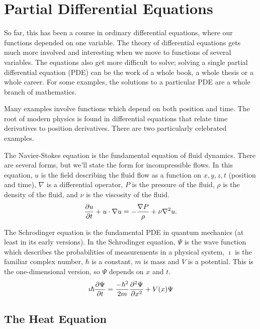 \documentclass[fleqn,letterpaper]{report}
\begin{document}
\chapter{Partial Differential Equations}
\label{pdes}

So far, this has been a course in ordinary differential
equations, where our functions depended on one variable. The
theory of differential equations gets much more involved and
interesting when we move to functions of several variables.
The equations also get more difficult to solve; solving a
single partial differential equation (PDE) can be the work of
a whole book, a whole thesis or a whole career. For some examples,
the solutions to a particular PDE are a whole branch of
mathematics.

Many examples involve functions which depend on both position
and time. The root of modern physics is found in
differential equations that relate time derivatives to
position derivatives. There are two particularly celebrated
examples. 

\begin{example}
The Navier-Stokes equation is the
fundamental equation of fluid dynamics.
There are several forms, but we'll state the form for
incompressible flows. In this equation, $u$ is the field
describing the fluid flow as a function on $x,y,z,t$ (position
and time), $\nabla$ is a differential operator, $P$ is the
pressure of the fluid, $\rho$ is the density of the fluid, and
$\nu$ is the viscosity of the fluid. 
\begin{equation*}
\frac{\partial u}{\partial t} + u \cdot \nabla u = - \frac{\nabla
P}{\rho} + \nu \nabla^2 u.
\end{equation*}
\end{example}

\begin{example}
The Schrodinger equation
is the fundamental PDE in quantum mechanics (at least in
its early versions). In the Schrodinger equation, $\Psi$ is
the wave function which describes the probabilities of
measurements in a physical system, $\imath$ is the familiar
complex number, $\hbar$ is a constant, $m$ is mass and $V$ is
a potential. This is the one-dimensional version, so $\Psi$ depends on
$x$ and $t$.
\begin{equation*}
\imath \hbar \frac{\partial \Psi}{\partial t} = \frac{-\hbar^2}{2m}
\frac{\partial^2 \Psi}{\partial x^2} + V(x) \Psi
\end{equation*}
\end{example}

\section{The Heat Equation}
\label{heat-equation}
\end{document}
